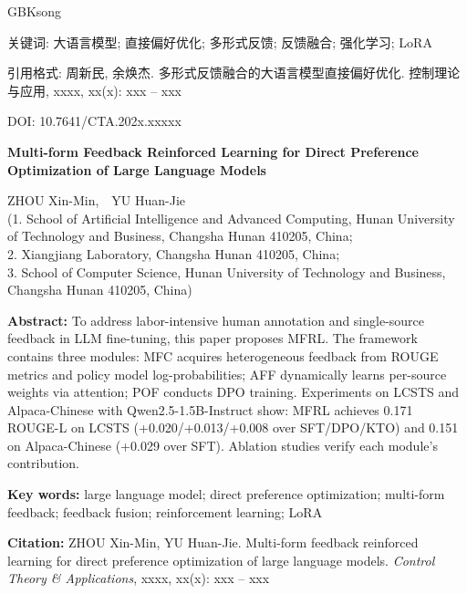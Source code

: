 \begin{CJK*}{GBK}{song}
\begin{center}
{{{ 关键词:} 大语言模型; 直接偏好优化; 多形式反馈; 反馈融合; 强化学习; LoRA

{ 引用格式:} 周新民, 余焕杰. 多形式反馈融合的大语言模型直接偏好优化. 控制理论与应用, xxxx, xx(x): xxx -- xxx\\\vspace*{-16pt}

DOI: 10.7641/CTA.202x.xxxxx
}}
\end{center}

\vspace{.1cm}
\begin{center}
\parbox{\textwidth}{\setlength{\parindent}{1em}
{\centering\Large\textbf{Multi-form Feedback Reinforced Learning for Direct Preference Optimization of Large Language Models\\}} \vspace{-1.2mm}
\begin{center}
ZHOU Xin-Min\makebox{$^{\dag}$},~~YU Huan-Jie\\[2pt]
\scriptsize{(1. School of Artificial Intelligence and Advanced Computing, Hunan University of Technology and Business, Changsha Hunan 410205, China;\\
2. Xiangjiang Laboratory, Changsha Hunan 410205, China;\\
3. School of Computer Science, Hunan University of Technology and Business, Changsha Hunan 410205, China)}
\end{center}

\vspace{-10pt}\footnotesize{\textbf{Abstract:} To address labor-intensive human annotation and single-source feedback in LLM fine-tuning, this paper proposes MFRL. The framework contains three modules: MFC acquires heterogeneous feedback from ROUGE metrics and policy model log-probabilities; AFF dynamically learns per-source weights via attention; POF conducts DPO training. Experiments on LCSTS and Alpaca-Chinese with Qwen2.5-1.5B-Instruct show: MFRL achieves 0.171 ROUGE-L on LCSTS (+0.020/+0.013/+0.008 over SFT/DPO/KTO) and 0.151 on Alpaca-Chinese (+0.029 over SFT). Ablation studies verify each module's contribution.

\textbf{Key words:} large language model; direct preference optimization; multi-form feedback; feedback fusion; reinforcement learning; LoRA

\textbf{Citation:} ZHOU Xin-Min, YU Huan-Jie. Multi-form feedback reinforced learning for direct preference optimization of large language models. {\it Control Theory \& Applications}, xxxx, xx(x): xxx -- xxx}}
\end{center}


\end{CJK*}
